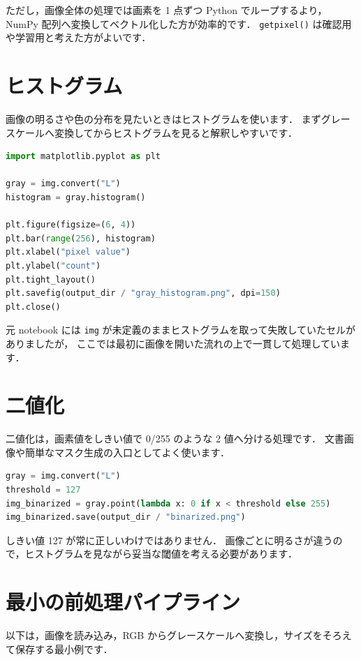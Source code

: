 ただし，画像全体の処理では画素を 1 点ずつ Python でループするより，NumPy 配列へ変換してベクトル化した方が効率的です．
\texttt{getpixel()} は確認用や学習用と考えた方がよいです．


\section{ヒストグラム}

画像の明るさや色の分布を見たいときはヒストグラムを使います．
まずグレースケールへ変換してからヒストグラムを見ると解釈しやすいです．

\begin{lstlisting}[style=codecell,language=Python]
import matplotlib.pyplot as plt

gray = img.convert("L")
histogram = gray.histogram()

plt.figure(figsize=(6, 4))
plt.bar(range(256), histogram)
plt.xlabel("pixel value")
plt.ylabel("count")
plt.tight_layout()
plt.savefig(output_dir / "gray_histogram.png", dpi=150)
plt.close()
\end{lstlisting}

元 notebook には \texttt{img} が未定義のままヒストグラムを取って失敗していたセルがありましたが，
ここでは最初に画像を開いた流れの上で一貫して処理しています．


\section{二値化}

二値化は，画素値をしきい値で 0/255 のような 2 値へ分ける処理です．
文書画像や簡単なマスク生成の入口としてよく使います．

\begin{lstlisting}[style=codecell,language=Python]
gray = img.convert("L")
threshold = 127
img_binarized = gray.point(lambda x: 0 if x < threshold else 255)
img_binarized.save(output_dir / "binarized.png")
\end{lstlisting}

しきい値 127 が常に正しいわけではありません．
画像ごとに明るさが違うので，ヒストグラムを見ながら妥当な閾値を考える必要があります．


\section{最小の前処理パイプライン}

以下は，画像を読み込み，RGB からグレースケールへ変換し，サイズをそろえて保存する最小例です．

